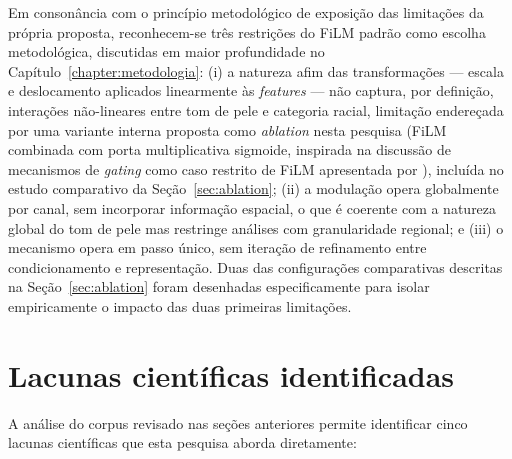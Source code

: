 Em consonância com o princípio metodológico de exposição das limitações da própria proposta, reconhecem-se três restrições do FiLM padrão como escolha metodológica, discutidas em maior profundidade no Capítulo~\ref{chapter:metodologia}: (i) a natureza afim das transformações --- escala e deslocamento aplicados linearmente às \emph{features} --- não captura, por definição, interações não-lineares entre tom de pele e categoria racial, limitação endereçada por uma variante interna proposta como \emph{ablation} nesta pesquisa (FiLM combinada com porta multiplicativa sigmoide, inspirada na discussão de mecanismos de \emph{gating} como caso restrito de FiLM apresentada por ), incluída no estudo comparativo da Seção~\ref{sec:ablation}; (ii) a modulação opera globalmente por canal, sem incorporar informação espacial, o que é coerente com a natureza global do tom de pele mas restringe análises com granularidade regional; e (iii) o mecanismo opera em passo único, sem iteração de refinamento entre condicionamento e representação. Duas das configurações comparativas descritas na Seção~\ref{sec:ablation} foram desenhadas especificamente para isolar empiricamente o impacto das duas primeiras limitações.

\section{Lacunas científicas identificadas}
\label{sec:rl_gaps}

A análise do corpus revisado nas seções anteriores permite identificar cinco lacunas científicas que esta pesquisa aborda diretamente:

